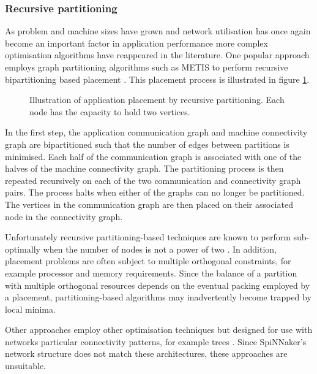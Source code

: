 			\subsubsection{Recursive partitioning}
				
				As problem and machine sizes have grown and network utilisation has
				once again become an important factor in application performance
				\cite{navaridas09b} more complex optimisation algorithms have
				reappeared in the literature. One popular approach employs graph
				partitioning algorithms such as METIS \cite{karypis98} to perform
				recursive bipartitioning based placement
				\cite{phillips14,hoefler11,pellegrini96}.  This placement process is
				illustrated in figure \ref{fig:partitioning}.
				
				\begin{figure}
					\center
					
					\caption{Illustration of application placement by recursive
					partitioning. Each node has the capacity to hold two vertices.}
					\label{fig:partitioning}
				\end{figure}
				
				In the first step, the application communication graph and machine
				connectivity graph are bipartitioned such that the number of edges
				between partitions is minimised. Each half of the communication graph
				is associated with one of the halves of the machine connectivity graph.
				The partitioning process is then repeated recursively on each of the
				two communication and connectivity graph pairs. The process halts when
				either of the graphs can no longer be partitioned. The vertices in the
				communication graph are then placed on their associated node in the
				connectivity graph.
				
				Unfortunately recursive partitioning-based techniques are known to
				perform sub-optimally when the number of nodes is not a power of two
				\cite{simon97}. In addition, placement problems are often subject to
				multiple orthogonal constraints, for example processor and memory
				requirements. Since the balance of a partition with multiple orthogonal
				resources depends on the eventual packing employed by a placement,
				partitioning-based algorithms may inadvertently become trapped by local
				minima.
				
				Other approaches employ other optimisation techniques but designed for
				use with networks particular connectivity patterns, for example trees
				\cite{jeannot14,traff02}. Since SpiNNaker's network structure does not
				match these architectures, these approaches are unsuitable.
	
